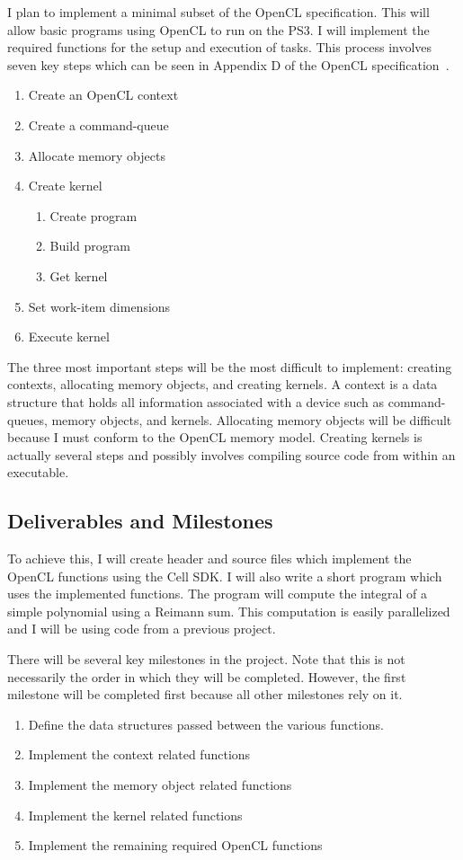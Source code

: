 I plan to implement a minimal subset of the
OpenCL specification. This will allow
basic programs using OpenCL to run on the PS3.
I will implement the required functions for
the setup and execution of tasks. This process
involves seven key steps which can be seen in
Appendix D of the OpenCL specification~\cite{opencl}.
\begin{enumerate}
\item Create an OpenCL context
\item Create a command-queue
\item Allocate memory objects
\item Create kernel
  \begin{enumerate}
    \item Create program
    \item Build program
    \item Get kernel
  \end{enumerate}
\item Set work-item dimensions
\item Execute kernel
\end{enumerate}

The three most important steps will 
be the most difficult to implement: creating contexts,
allocating memory objects, and creating kernels.
A context is a data structure that holds all information associated with a
device such as command-queues, memory objects,
and kernels. Allocating memory objects will
be difficult because I must conform to
the OpenCL memory model. Creating kernels
is actually several steps and possibly involves compiling
source code from within an executable. 

\subsection{Deliverables and Milestones}
To achieve this, I will create header and source files which
implement the OpenCL functions using the Cell SDK.
I will also write a short program which uses the
implemented functions. The program will compute
the integral of a simple polynomial using a
Reimann sum. This computation is easily parallelized
and I will be using code from a previous project.

There will be several key milestones in the project.
Note that this is not necessarily the order in which they will be completed.
However, the first milestone will be completed first because
all other milestones rely on it.
\begin{enumerate}
  \item Define the data structures passed 
    between the various functions. 
  \item Implement the context related functions
  \item Implement the memory object related functions
  \item Implement the kernel related functions
  \item Implement the remaining required OpenCL functions
\end{enumerate}

